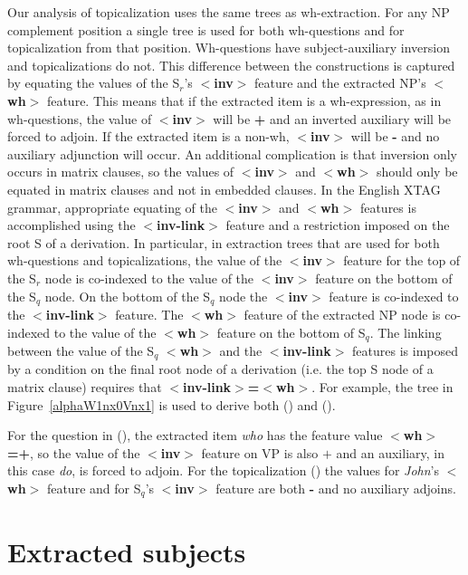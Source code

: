Our analysis of topicalization uses the same trees as wh-extraction.  For any
NP complement position a single tree is used for both wh-questions and for
topicalization from that position. Wh-questions have subject-auxiliary
inversion and topicalizations do not.  This difference between the
constructions is captured by equating the values of the S$_{r}$'s {\bf
$<$inv$>$} feature and the extracted NP's {\bf $<$wh$>$} feature.  This means
that if the extracted item is a wh-expression, as in wh-questions, the value of
{\bf $<$inv$>$} will be {\bf +} and an inverted auxiliary will be forced to
adjoin. If the extracted item is a non-wh, {\bf $<$inv$>$} will be {\bf -}
and no auxiliary adjunction will occur. An additional complication is that
inversion only occurs in matrix clauses, so the values of {\bf $<$inv$>$} and
{\bf $<$wh$>$} should only be equated in matrix clauses and not in embedded
clauses.  In the English XTAG grammar, appropriate equating of the {\bf
$<$inv$>$} and {\bf $<$wh$>$} features is accomplished using the {\bf
$<$inv-link$>$} feature and a restriction imposed on the root S of a
derivation. In particular, in extraction trees that are used for both
wh-questions and topicalizations, the value of the {\bf $<$inv$>$} feature for
the top of the S$_{r}$ node is co-indexed to the value of the {\bf $<$inv$>$}
feature on the bottom of the S$_{q}$ node.  On the bottom of the S$_{q}$ node
the {\bf $<$inv$>$} feature is co-indexed to the {\bf $<$inv-link$>$} feature.
The {\bf $<$wh$>$} feature of the extracted NP node is co-indexed to the value
of the {\bf $<$wh$>$} feature on the bottom of S$_{q}$. The linking between the
value of the S$_{q}$ {\bf $<$wh$>$} and the {\bf $<$inv-link$>$} features is
imposed by a condition on the final root node of a derivation (i.e. the top S
node of a matrix clause) requires that {\bf $<$inv-link$>$=$<$wh$>$}.  For
example, the tree in Figure~\ref{alphaW1nx0Vnx1} is used to
derive both () and ().



For the question in (), the extracted item {\it who} has the feature
value {\bf $<$wh$>$=+}, so the value of the {\bf $<$inv$>$} feature on VP is
also $+$ and an auxiliary, in this case {\it do}, is forced to adjoin.  For the
topicalization () the values for {\it John}'s {\bf $<$wh$>$} feature and
for S$_{q}$'s {\bf $<$inv$>$} feature are both {\bf -} and no auxiliary
adjoins.



\section{Extracted subjects}
\label{subject-extraction}

